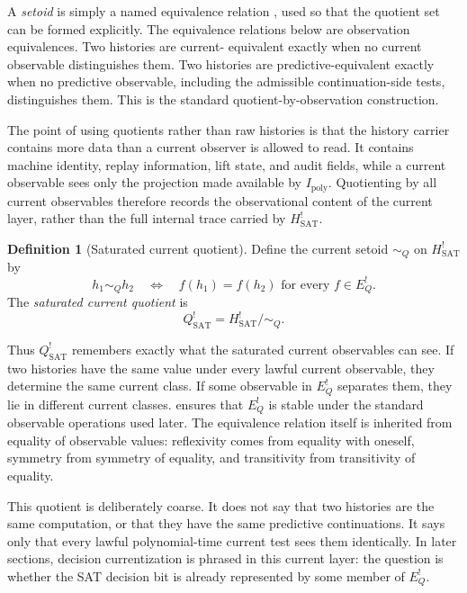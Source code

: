 \documentclass[11pt]{article}
\newcommand{\Hsat}{H^{!}_{\mathrm{SAT}}}
\newcommand{\Ipoly}{I_{\mathrm{poly}}}
\newcommand{\EQbang}{E^{!}_{Q}}
\newcommand{\Qsat}{Q^{!}_{\mathrm{SAT}}}
\theoremstyle{definition}
\newtheorem{definition}[theorem]{Definition}
\begin{document}
A \emph{setoid} is simply a named equivalence relation
\citep{MartinLof1984IntuitionisticTypeTheory}, used so that the
quotient set can be formed explicitly.  The equivalence relations
below are observation equivalences.  Two histories are current-
equivalent exactly when no current observable distinguishes them.  Two
histories are predictive-equivalent exactly when no predictive
observable, including the admissible continuation-side tests,
distinguishes them.  This is the standard quotient-by-observation
construction.

The point of using quotients rather than raw histories is that the
history carrier contains more data than a current observer is allowed
to read.  It contains machine identity, replay information, lift
state, and audit fields, while a current observable sees only the
projection made available by \(\Ipoly\).  Quotienting by all current
observables therefore records the observational content of the current
layer, rather than the full internal trace carried by \(\Hsat\).

\begin{definition}[Saturated current quotient]
\label{def:pvnp:q-saturated}
Define the current setoid \(\sim_{Q}\) on \(\Hsat\) by
\[
  h_{1}\sim_{Q}h_{2}
  \quad\Longleftrightarrow\quad
  f(h_{1})=f(h_{2})
  \text{ for every } f\in\EQbang .
\]
The \emph{saturated current quotient} is
\[
  \Qsat=\Hsat/{\sim_{Q}} .
\]
\end{definition}

Thus \(\Qsat\) remembers exactly what the saturated current
observables can see.  If two histories have the same value under
every lawful current observable, they determine the same current
class.  If some observable in \(\EQbang\) separates them, they lie in
different current classes.  
ensures that
\(\EQbang\) is stable under the standard observable operations used
later.  The equivalence relation itself is inherited from equality of
observable values: reflexivity comes from equality with oneself,
symmetry from symmetry of equality, and transitivity from transitivity
of equality.

This quotient is deliberately coarse.  It does not say that two
histories are the same computation, or that they have the same
predictive continuations.  It says only that every lawful
polynomial-time current test sees them identically.  In later
sections, decision currentization is phrased in this current layer:
the question is whether the SAT decision bit is already represented by
some member of \(\EQbang\).
\end{document}
